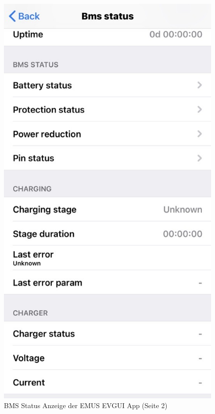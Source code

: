 \begin{figure}[H]
	\begin{center}
		\includegraphics[scale=0.4]{figures/Akku/BMSStatus2.png}
		\caption{BMS Status Anzeige der EMUS EVGUI App (Seite 2)}
		\label{fig: BMS Status Anzeige der EMUS EVGUI App (Seite 2)}
	\end{center}
\end{figure}


